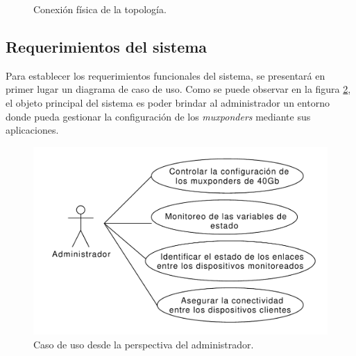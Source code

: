 \begin{figure}[H]
    \centering
    \caption{Conexión física de la topología.}
    \label{fig:topologiafis}
  \end{figure}


\subsection{Requerimientos del sistema}

Para establecer los requerimientos funcionales del sistema, se presentará en primer lugar un diagrama de caso de uso. Como se puede observar en la figura \ref{fig:caso_uso_admin}, el objeto principal del sistema es poder brindar al administrador un entorno donde pueda gestionar la configuración de los \textit{muxponders} mediante sus aplicaciones.

\begin{figure}[H]
    \centering
    \includegraphics[scale=0.53]{Figures/caso_uso_admin.pdf}
    \caption{Caso de uso desde la perspectiva del administrador.}
    \label{fig:caso_uso_admin}
  \end{figure}

